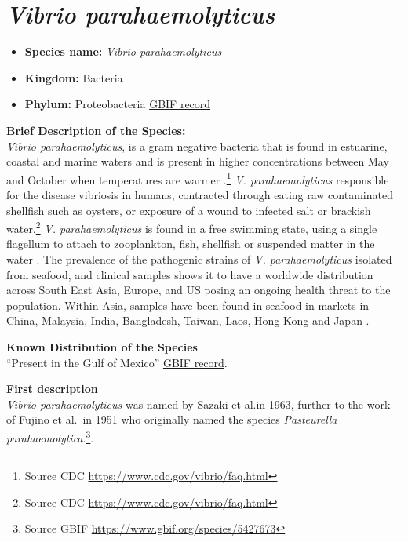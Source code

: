 \documentclass[]{book}
\providecommand{\tightlist}{%
  \setlength{\itemsep}{0pt}\setlength{\parskip}{0pt}}
\theoremstyle{definition}
\theoremstyle{definition}
\theoremstyle{definition}
\theoremstyle{remark}
\begin{document}
\hypertarget{vibrio-parahaemolyticus}{%
\section{\texorpdfstring{\emph{Vibrio
parahaemolyticus}}{Vibrio parahaemolyticus}}\label{vibrio-parahaemolyticus}}

\begin{itemize}
\tightlist
\item
  \textbf{Species name:} \emph{Vibrio parahaemolyticus}
\item
  \textbf{Kingdom:} Bacteria\\
\item
  \textbf{Phylum:} Proteobacteria
  \href{https://www.gbif.org/species/5427673}{GBIF record}
\end{itemize}

\textbf{Brief Description of the Species:}\\
\emph{Vibrio parahaemolyticus}, is a gram negative bacteria that is
found in estuarine, coastal and marine waters and is present in higher
concentrations between May and October when temperatures are warmer
\citep{Letchumanan_2014}.\footnote{Source CDC
  \url{https://www.cdc.gov/vibrio/faq.html}} \emph{V. parahaemolyticus}
responsible for the disease vibriosis in humans, contracted through
eating raw contaminated shellfish such as oysters, or exposure of a
wound to infected salt or brackish water.\footnote{Source CDC
  \url{https://www.cdc.gov/vibrio/faq.html}} \emph{V. parahaemolyticus}
is found in a free swimming state, using a single flagellum to attach to
zooplankton, fish, shellfish or suspended matter in the water
\citep{Letchumanan_2014}. The prevalence of the pathogenic strains of
\emph{V. parahaemolyticus} isolated from seafood, and clinical samples
shows it to have a worldwide distribution across South East Asia,
Europe, and US posing an ongoing health threat to the population. Within
Asia, samples have been found in seafood in markets in China, Malaysia,
India, Bangladesh, Taiwan, Laos, Hong Kong and Japan
\citep{Letchumanan_2014}.

\textbf{Known Distribution of the Species}\\
``Present in the Gulf of Mexico''
\href{http://www.gbif.org/species/5427673}{GBIF record}.

\textbf{First description}\\
\emph{Vibrio parahaemolyticus} was named by Sazaki et al.in 1963,
further to the work of Fujino et al.~in 1951 who originally named the
species \emph{Pasteurella parahaemolytica}.\footnote{Source GBIF
  \url{https://www.gbif.org/species/5427673}}.
\end{document}
